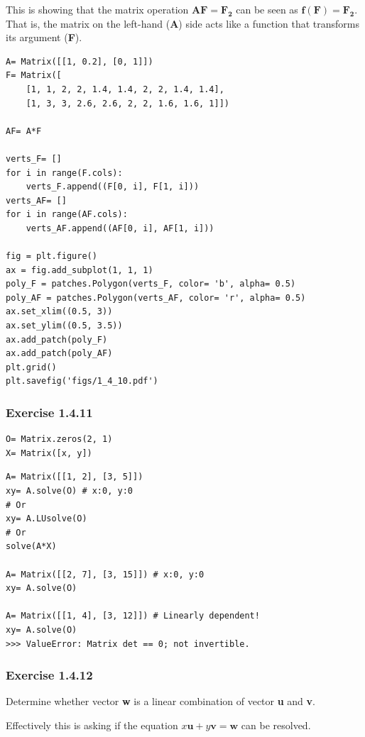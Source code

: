 This is showing that the matrix operation $\mathbf{AF} = \mathbf{F_2}$ can be seen as
$\mathbf{f(F)}= \mathbf{F_2}$. That is, the matrix on the left-hand (\textbf{A})
side acts like a function that transforms its argument (\textbf{F}).

\begin{verbatim}
A= Matrix([[1, 0.2], [0, 1]])
F= Matrix([
    [1, 1, 2, 2, 1.4, 1.4, 2, 2, 1.4, 1.4],
    [1, 3, 3, 2.6, 2.6, 2, 2, 1.6, 1.6, 1]])

AF= A*F

verts_F= []
for i in range(F.cols):
    verts_F.append((F[0, i], F[1, i]))
verts_AF= []
for i in range(AF.cols):
    verts_AF.append((AF[0, i], AF[1, i]))

fig = plt.figure()
ax = fig.add_subplot(1, 1, 1)
poly_F = patches.Polygon(verts_F, color= 'b', alpha= 0.5)
poly_AF = patches.Polygon(verts_AF, color= 'r', alpha= 0.5)
ax.set_xlim((0.5, 3))
ax.set_ylim((0.5, 3.5))
ax.add_patch(poly_F)
ax.add_patch(poly_AF)
plt.grid()
plt.savefig('figs/1_4_10.pdf')
\end{verbatim}

\subsubsection{Exercise 1.4.11}

\begin{verbatim}
O= Matrix.zeros(2, 1)
X= Matrix([x, y])
\end{verbatim}

\begin{verbatim}
A= Matrix([[1, 2], [3, 5]])
xy= A.solve(O) # x:0, y:0
# Or
xy= A.LUsolve(O) 
# Or
solve(A*X)

A= Matrix([[2, 7], [3, 15]]) # x:0, y:0
xy= A.solve(O)

A= Matrix([[1, 4], [3, 12]]) # Linearly dependent!
xy= A.solve(O)
>>> ValueError: Matrix det == 0; not invertible.
\end{verbatim}

\subsubsection{Exercise 1.4.12}

Determine whether vector \textbf{w} is a linear combination of vector \textbf{u}
and \textbf{v}.

Effectively this is asking if the equation $x\mathbf{u} + y\mathbf{v} = \mathbf{w}$
can be resolved.


